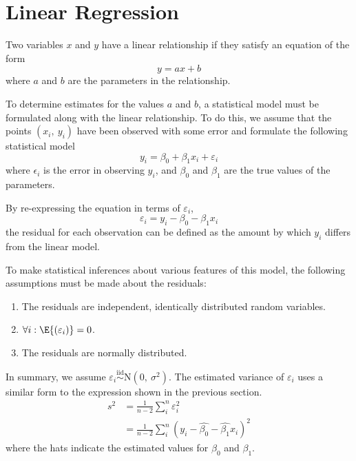 \documentclass{article}
\begin{document}
\section{Linear Regression}
\begin{definition}
    Two variables \(x\) and \(y\) have a linear relationship if they satisfy an equation of the form
    \begin{equation*}
        y = a x + b
    \end{equation*}
    where \(a\) and \(b\) are the parameters in the relationship.
\end{definition}
To determine estimates for the values \(a\) and \(b\), a statistical model must be formulated along with the linear relationship.
To do this, we assume that the points \(\left( x_i,\: y_i \right)\) have been observed with some error and formulate the following statistical model
\begin{equation*}
    y_i = \beta_0 + \beta_1 x_i + \varepsilon_i
\end{equation*}
where \(\epsilon_i\) is the error in observing \(y_i\), and \(\beta_0\) and \(\beta_1\) are the true values of the parameters.
\begin{definition}[Residual]
    By re-expressing the equation in terms of \(\varepsilon_i\),
    \begin{equation*}
        \varepsilon_i = y_i - \beta_0 - \beta_1 x_i
    \end{equation*}
    the residual for each observation can be defined as the amount by which \(y_i\) differs from the linear model.
\end{definition}
To make statistical inferences about various features of this model, the following assumptions must be made about the residuals:
\begin{enumerate}
    \item The residuals are independent, identically distributed random variables.
    \item \(\forall i : \E{\left( \varepsilon_i \right)} = 0\).
    \item The residuals are normally distributed.
\end{enumerate}
In summary, we assume \(\varepsilon_i \stackrel{\mathrm{iid}}{\sim} \mathrm{N}\left( 0,\: \sigma^2 \right)\).
The estimated variance of \(\varepsilon_i\) uses a similar form to the expression shown in the previous section.
\begin{align*}
    s^2 & = \frac{1}{n- 2} \sum_i^n \varepsilon_i^2                                          \\
        & = \frac{1}{n- 2} \sum_i^n \left( y_i - \hat{\beta_0} - \hat{\beta_1} x_i \right)^2
\end{align*}
where the hats indicate the estimated values for \(\beta_0\) and \(\beta_1\).
\end{document}
